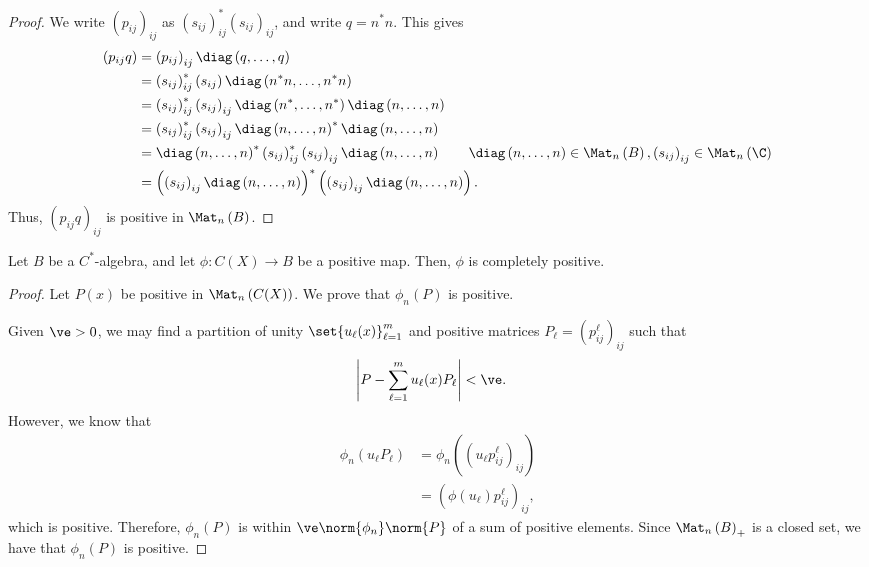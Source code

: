 \documentclass[10pt]{mypackage}
\begin{document}
\begin{proof}
  We write $\left( p_{ij} \right)_{ij}$ as $\left( s_{ij} \right)_{ij}^{\ast}\left( s_{ij} \right)_{ij}$, and write $q = n^{\ast}n$. This gives
  \begin{align*}
    \left( p_{ij}q \right) &= \left( p_{ij} \right)_{ij} \diag\left( q,\dots,q \right)\\
                           &= \left( s_{ij} \right)_{ij}^{\ast}\left( s_{ij} \right) \diag\left( n^{\ast}n,\dots,n^{\ast}n \right)\\
                           &= \left( s_{ij} \right)_{ij}^{\ast}\left( s_{ij} \right)_{ij}\diag\left( n^{\ast},\dots,n^{\ast} \right)\diag\left( n,\dots,n \right)\\
                           &= \left( s_{ij} \right)_{ij}^{\ast}\left( s_{ij} \right)_{ij}\diag\left( n,\dots,n \right)^{\ast}\diag\left( n,\dots,n \right)\\
                           &= \diag\left( n,\dots,n \right)^{\ast}\left( s_{ij} \right)_{ij}^{\ast}\left( s_{ij} \right)_{ij}\diag\left( n,\dots,n \right) \tag*{$\diag\left( n,\dots,n \right)\in \Mat_n\left( B \right),\left( s_{ij} \right)_{ij}\in \Mat_n\left( \C \right)$}\\
                           &= \left( \left( s_{ij} \right)_{ij}\diag\left( n,\dots,n \right) \right)^{\ast}\left( \left( s_{ij} \right)_{ij}\diag\left( n,\dots,n \right) \right).
  \end{align*}
  Thus, $\left( p_{ij}q \right)_{ij}$ is positive in $\Mat_n\left( B \right)$.
\end{proof}
\begin{theorem}
  Let $B$ be a $C^{\ast}$-algebra, and let $\phi\colon C(X)\rightarrow B$ be a positive map. Then, $\phi$ is completely positive.
\end{theorem}
\begin{proof}
  Let $P(x)$ be positive in $\Mat_n\left( C(X) \right)$. We prove that $\phi_n(P)$ is positive.\newline

  Given $\ve > 0$, we may find a partition of unity $\set{u_{\ell}(x)}_{\ell=1}^{m}$ and positive matrices $P_{\ell} = \left( p_{ij}^{\ell} \right)_{ij}$ such that
  \begin{align*}
    \left\vert P - \sum_{\ell=1}^{m} u_{\ell}(x)P_{\ell}\right\vert &< \ve.
  \end{align*}
  However, we know that
  \begin{align*}
    \phi_n\left( u_{\ell}P_{\ell} \right) &= \phi_n\left( \left( u_{\ell}p_{ij}^{\ell} \right)_{ij} \right)\\
                                          &= \left( \phi\left( u_{\ell} \right)p_{ij}^{\ell} \right)_{ij},
  \end{align*}
  which is positive. Therefore, $\phi_n(P)$ is within $\ve \norm{\phi_n}\norm{P}$ of a sum of positive elements. Since $\Mat_n\left( B \right)_{+}$ is a closed set, we have that $\phi_n\left( P \right)$ is positive.
\end{proof}
\end{document}
